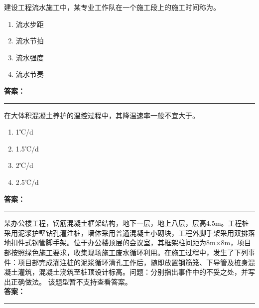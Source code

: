 \documentclass[UTF8,fontset=fandol,11pt]{ctexart}
\newcommand{\answerline}{\textcolor{answerred}{\rule{2.4cm}{0.7pt}}}
\begin{document}
\begin{quizbox}[title={乱序第 251 题｜第十章流水施工原理}]

建设工程流水施工中，某专业工作队在一个施工段上的施工时间称为。\\

\begin{enumerate}[label=\Alph*.]

\item 流水步距

\item 流水节拍

\item 流水强度

\item 流水节奏

\end{enumerate}

\textbf{\textcolor{answerred}{答案：}} \answerline

\end{quizbox}

\vspace{0.2em}

\begin{quizbox}[title={乱序第 252 题｜第四章混凝土结构工程}]

在大体积混凝土养护的温控过程中，其降温速率一般不宜大于。\\

\begin{enumerate}[label=\Alph*.]

\item 1℃/d

\item 1.5℃/d

\item 2℃/d

\item 2.5℃/d

\end{enumerate}

\textbf{\textcolor{answerred}{答案：}} \answerline

\end{quizbox}

\vspace{0.2em}

\begin{quizbox}[title={乱序第 253 题｜第二章桩基础工程}]

某办公楼工程，钢筋混凝土框架结构，地下一层，地上八层，层高4.5m。工程桩采用泥浆护壁钻孔灌注桩，墙体采用普通混凝土小砌块，工程外脚手架采用双排落地扣件式钢管脚手架。位于办公楼顶层的会议室，其框架柱间距为8m×8m，项目部按照绿色施工要求，收集现场施工废水循环利用。在施工过程中，发生了下列事件：项目部完成灌注桩的泥浆循环清孔工作后，随即放置钢筋笼、下导管及桩身混凝土灌筑，混凝土浇筑至桩顶设计标高。问题：分别指出事件中的不妥之处，并写出正确做法。 该题型暂不支持查看答案。\\

\textbf{\textcolor{answerred}{答案：}} \answerline

\end{quizbox}
\end{document}
